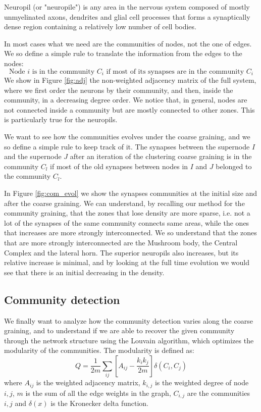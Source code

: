 Neuropil (or "neuropile") is any area in the nervous system composed of mostly unmyelinated axons, dendrites and glial 
cell processes that forms a synaptically dense region containing a relatively low 
number of cell bodies. 

In most cases what we need are the communities of nodes, not the one of edges. We so define a 
simple rule to translate the information from the edges to the nodes: 
$$
\mbox{Node $i$ is in the community $C_i$ if most of its synapses are in the community $C_i$}
$$
We show in Figure \ref{fig:adj} the non-weighted adjacency matrix of the full system, where we
first order the neurons by their community, and then, inside the community, in a decreasing 
degree order. We notice that, in general, nodes are not connected inside a community but are 
mostly connected to other zones. This is particularly true for the neuropils.

We want to see how the communities evolves under the coarse graining, and we so define a simple rule
to keep track of it. The synapses between the supernode $I$ and the supernode $J$ after an iteration
of the clustering coarse graining is in the community $C_l$ if most of the old synapses between
nodes in $I$ and $J$ belonged to the community $C_l$.

In Figure \ref{fig:com_evol} we show the synapses communities at the initial size and after the
coarse graining. We can understand, by recalling our method for the community graining, that the 
zones that lose density are more sparse, i.e. not a lot of the synapses of the same community connects
same areas, while the ones that increases are more strongly interconnected. We so understand that the zones
that are more strongly interconnected are the Mushroom body, the Central Complex and the lateral horn.
The superior neuropils also increases, but its relative increase is minimal, and by looking at the 
full time evolution we would see that there is an initial decreasing in the density.

\subsection{Community detection}
We finally want to analyze how the community detection varies along the coarse 
graining, and to understand if we are able to recover the given community through
the network structure using the Louvain algorithm, which optimizes the modularity
of the communities.
The modularity is defined as:
\begin{equation}
    Q = \frac{1}{2m}\sum_{ij} \left[A_{ij}-\frac{k_ik_j}{2m}\right] \delta(C_i, C_j)
\end{equation}
where $A_{ij}$ is the weighted adjacency matrix, $k_{i,j}$ is the weighted degree of node $i,j$,
$m$ is the sum of all the edge weights in the graph, $C_{i,j}$ are the communities $i,j$ and $\delta(x)$ is the
Kronecker delta function.


